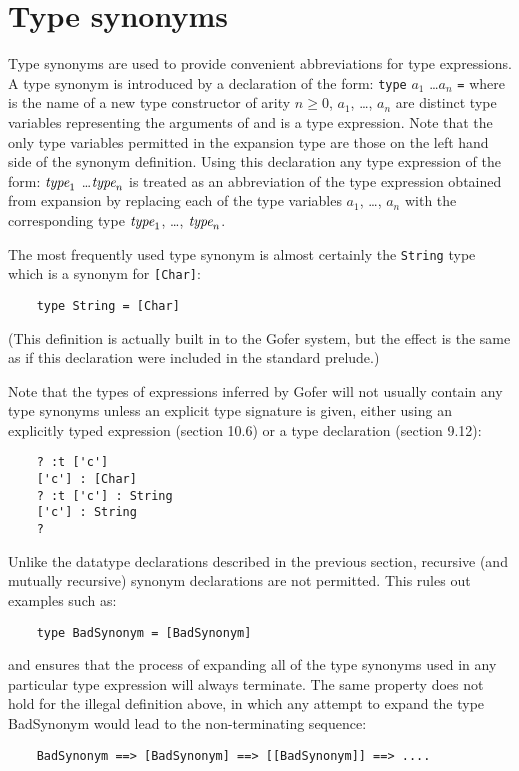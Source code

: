 \section{Type synonyms}
Type synonyms are used to provide  convenient  abbreviations  for  type
expressions.  A type synonym is introduced  by  a  declaration  of  the
form:
\BQ
    \verb"type"  $a_1$ \dots $a_n$ \verb"=" 
\EQ
where  is the name of a new type constructor  of  arity  
$n\geq 0$,  
$a_1$, \dots, $a_n$ are distinct type variables 
representing the arguments of  
and  is a type expression.  Note that the only type  variables
permitted in the expansion type are those on the left hand side of  the
synonym definition.  Using this declaration any type expression of  the
form:
\BQ
     $\mbox{{\it type}}_1$ \dots $\mbox{{\it type}}_n$ 
\EQ
is treated as an abbreviation of  the  type  expression  obtained  from
expansion by replacing each of the type variables 
$a_1$, \dots, $a_n$ with  the
corresponding type $\mbox{{\it type}}_1$, \dots, $\mbox{{\it type}}_n$.

The most frequently used type synonym is almost  certainly  the  \verb"String"
type which is a synonym for \verb"[Char]":
\begin{verbatim}
    type String = [Char]
\end{verbatim}
(This definition is actually built in to the Gofer  system,  but
the effect is the same as if this  declaration  were  included  in  the
standard prelude.)

Note that the types of expressions inferred by Gofer will  not  usually
contain any type synonyms unless an explicit type signature  is  given,
either using an explicitly typed expression (section 10.6)  or  a  type
declaration (section 9.12):
\begin{verbatim}
    ? :t ['c']
    ['c'] : [Char]
    ? :t ['c'] : String
    ['c'] : String
    ?
\end{verbatim}
Unlike the datatype declarations described  in  the  previous  section,
recursive  (and  mutually  recursive)  synonym  declarations  are   not
permitted.  This rules out examples such as:
\begin{verbatim}
    type BadSynonym = [BadSynonym]
\end{verbatim}
and ensures that the process of expanding all of the type synonyms used
in any particular type expression  will  always  terminate.   The  same
property does not hold for the illegal definition above, in  which  any
attempt to expand the type BadSynonym would lead to the non-terminating
sequence:
\begin{verbatim}
    BadSynonym ==> [BadSynonym] ==> [[BadSynonym]] ==> ....
\end{verbatim}




